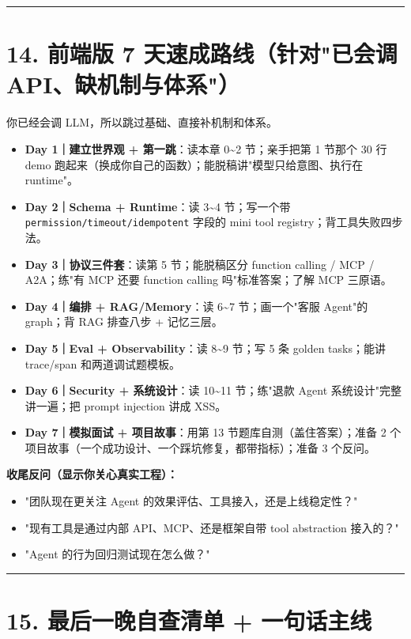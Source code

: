 \bigskip\hrule\bigskip

\section{14. 前端版 7 天速成路线（针对"已会调 API、缺机制与体系"）}

你已经会调 LLM，所以跳过基础、直接补机制和体系。

\begin{itemize}[leftmargin=2em]
\item \textbf{Day 1｜建立世界观 + 第一跳}：读本章 0\~{}2 节；亲手把第 1 节那个 30 行 demo 跑起来（换成你自己的函数）；能脱稿讲"模型只给意图、执行在 runtime"。
\item \textbf{Day 2｜Schema + Runtime}：读 3\~{}4 节；写一个带 \texttt{permission/timeout/idempotent} 字段的 mini tool registry；背工具失败四步法。
\item \textbf{Day 3｜协议三件套}：读第 5 节；能脱稿区分 function calling / MCP / A2A；练"有 MCP 还要 function calling 吗"标准答案；了解 MCP 三原语。
\item \textbf{Day 4｜编排 + RAG/Memory}：读 6\~{}7 节；画一个"客服 Agent"的 graph；背 RAG 排查八步 + 记忆三层。
\item \textbf{Day 5｜Eval + Observability}：读 8\~{}9 节；写 5 条 golden tasks；能讲 trace/span 和两道调试题模板。
\item \textbf{Day 6｜Security + 系统设计}：读 10\~{}11 节；练"退款 Agent 系统设计"完整讲一遍；把 prompt injection 讲成 XSS。
\item \textbf{Day 7｜模拟面试 + 项目故事}：用第 13 节题库自测（盖住答案）；准备 2 个项目故事（一个成功设计、一个踩坑修复，都带指标）；准备 3 个反问。
\end{itemize}

\textbf{收尾反问（显示你关心真实工程）：}
\begin{itemize}[leftmargin=2em]
\item "团队现在更关注 Agent 的效果评估、工具接入，还是上线稳定性？"
\item "现有工具是通过内部 API、MCP、还是框架自带 tool abstraction 接入的？"
\item "Agent 的行为回归测试现在怎么做？"
\end{itemize}

\bigskip\hrule\bigskip

\section{15. 最后一晚自查清单 + 一句话主线}

